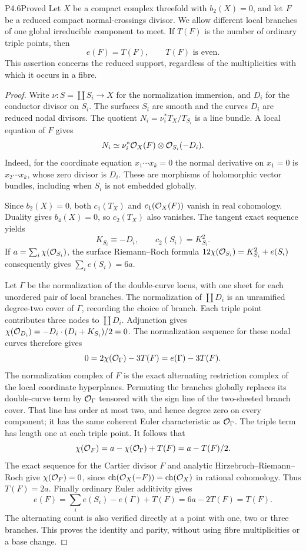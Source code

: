 \begin{statement}{P4.6}{Proved}
Let $X$ be a compact complex threefold with $b_2(X)=0$, and let $F$ be a
reduced compact normal-crossings divisor. We allow different local
branches of one global irreducible component to meet. If $T(F)$ is the
number of ordinary triple points, then
\[
 e(F)=T(F),\qquad T(F)\text{ is even}.
\]
This assertion concerns the reduced support, regardless of the
multiplicities with which it occurs in a fibre.
\end{statement}
\begin{proof}
Write $\nu:S=\coprod S_i\to X$ for the normalization immersion, and $D_i$
for the conductor divisor on $S_i$. The surfaces $S_i$ are smooth and
the curves $D_i$ are reduced nodal divisors. The quotient
$N_i=\nu_i^*T_X/T_{S_i}$ is a line bundle. A local equation of $F$ gives
\[
 N_i\simeq \nu_i^*\mathcal O_X(F)\otimes\mathcal O_{S_i}(-D_i).
\]
Indeed, for the coordinate equation $x_1\cdots x_k=0$ the normal
derivative on $x_1=0$ is $x_2\cdots x_k$, whose zero divisor is $D_i$.
These are morphisms of holomorphic vector bundles, including when
$S_i$ is not embedded globally.

Since $b_2(X)=0$, both $c_1(T_X)$ and $c_1(\mathcal O_X(F))$ vanish in real
cohomology. Duality gives $b_4(X)=0$, so $c_2(T_X)$ also vanishes. The
tangent exact sequence yields
\[
 K_{S_i}\equiv-D_i,\qquad c_2(S_i)=K_{S_i}^2.
\]
If $a=\sum_i\chi(\mathcal O_{S_i})$, the surface Riemann--Roch formula
$12\chi(\mathcal O_{S_i})=K_{S_i}^2+e(S_i)$ consequently gives
$\sum_i e(S_i)=6a$.

Let $\Gamma$ be the normalization of the double-curve locus, with one
sheet for each unordered pair of local branches. The normalization of
$\coprod D_i$ is an unramified degree-two cover of $\Gamma$, recording
the choice of branch. Each triple point contributes three nodes to
$\coprod D_i$. Adjunction gives
$\chi(\mathcal O_{D_i})=-D_i\cdot(D_i+K_{S_i})/2=0$. The normalization
sequence for these nodal curves therefore gives
\[
 0=2\chi(\mathcal O_\Gamma)-3T(F)=e(\Gamma)-3T(F).
\]
The normalization complex of $F$ is the exact alternating restriction
complex of the local coordinate hyperplanes. Permuting the branches
globally replaces its double-curve term by $\mathcal O_\Gamma$ tensored with
the sign line of the two-sheeted branch cover. That line has order at
most two, and hence degree zero on every component; it has the same
coherent Euler characteristic as $\mathcal O_\Gamma$. The triple term has
length one at each triple point. It follows that
\[
 \chi(\mathcal O_F)=a-\chi(\mathcal O_\Gamma)+T(F)=a-T(F)/2.
\]
The exact sequence for the Cartier divisor $F$ and analytic
Hirzebruch--Riemann--Roch give $\chi(\mathcal O_F)=0$, since
$\operatorname{ch}(\mathcal O_X(-F))=\operatorname{ch}(\mathcal O_X)$ in rational
cohomology. Thus $T(F)=2a$. Finally ordinary Euler additivity gives
\[
 e(F)=\sum_i e(S_i)-e(\Gamma)+T(F)=6a-2T(F)=T(F).
\]
The alternating count is also verified directly at a point with one,
two or three branches. This proves the identity and parity, without
using fibre multiplicities or a base change.
\end{proof}

